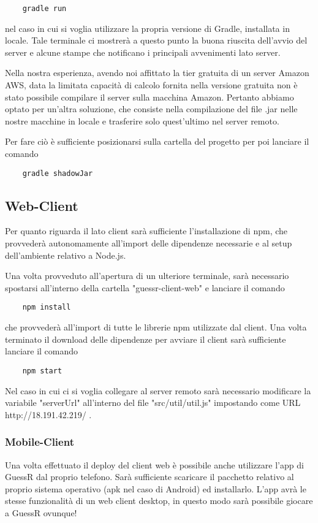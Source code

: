 \begin{verbatim}
    gradle run
\end{verbatim}

\noindent nel caso in cui si voglia utilizzare la propria versione di Gradle, installata in locale.
Tale terminale ci mostrerà a questo punto la buona riuscita dell'avvio del server e alcune stampe che notificano i principali avvenimenti lato server. \newline

\noindent Nella nostra esperienza, avendo noi affittato la tier gratuita di un server Amazon AWS, data la limitata capacità di calcolo fornita nella versione gratuita non è stato possibile compilare il server sulla macchina Amazon. Pertanto abbiamo optato per un'altra soluzione, che consiste nella compilazione del file .jar nelle nostre macchine in locale e trasferire solo quest'ultimo nel server remoto.\newline

\noindent Per fare ciò è sufficiente posizionarsi sulla cartella del progetto per poi lanciare il comando

\begin{verbatim}
    gradle shadowJar
\end{verbatim}


\subsection{Web-Client}
Per quanto riguarda il lato client sarà sufficiente l'installazione di npm, che provvederà autonomamente all'import delle dipendenze necessarie e al setup dell'ambiente relativo a Node.js. \newline

\noindent Una volta provveduto all'apertura di un ulteriore terminale, sarà necessario spostarsi all'interno della cartella "guessr-client-web" e lanciare il comando

\begin{verbatim}
    npm install
\end{verbatim}

che provvederà all'import di tutte le librerie npm utilizzate dal client. Una volta terminato il download delle dipendenze per avviare il client sarà sufficiente lanciare il comando

\begin{verbatim}
    npm start
\end{verbatim}

Nel caso in cui ci si voglia collegare al server remoto sarà necessario modificare la variabile "serverUrl" all'interno del file "src/util/util.js" impostando come URL http://18.191.42.219/ .

\subsubsection{Mobile-Client}
Una volta effettuato il deploy del client web è possibile anche utilizzare l'app di GuessR dal proprio telefono. Sarà sufficiente scaricare il pacchetto relativo al proprio sistema operativo (apk nel caso di Android) ed installarlo. L'app avrà le stesse funzionalità di un web client desktop, in questo modo sarà possibile giocare a GuessR ovunque!
\newpage
